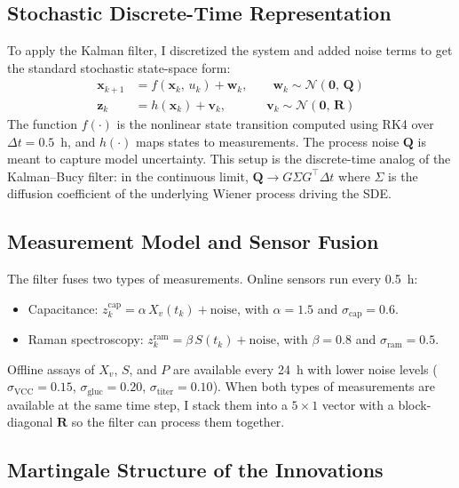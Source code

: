 \documentclass[11pt,letterpaper]{article}
\newcommand{\xv}{X_{v}}
\newcommand{\bx}{\mathbf{x}}
\newcommand{\bz}{\mathbf{z}}
\newcommand{\bw}{\mathbf{w}}
\newcommand{\bv}{\mathbf{v}}
\newcommand{\bQ}{\mathbf{Q}}
\newcommand{\bR}{\mathbf{R}}
\begin{document}
\subsection{Stochastic Discrete-Time Representation}

To apply the Kalman filter, I discretized the system and added noise terms to get the
standard stochastic state-space form:
\begin{align}
    \bx_{k+1} &= f(\bx_k,\, u_k) + \bw_k, \qquad \bw_k \sim \mathcal{N}(\mathbf{0},\, \bQ)
    \label{eq:process}\\
    \bz_k     &= h(\bx_k) + \bv_k, \qquad\quad\ \bv_k \sim \mathcal{N}(\mathbf{0},\, \bR)
    \label{eq:obs}
\end{align}
The function $f(\cdot)$ is the nonlinear state transition computed using RK4 over $\Delta t = 0.5$~h,
and $h(\cdot)$ maps states to measurements. The process noise $\bQ$ is meant to capture
model uncertainty. This setup is the discrete-time analog of the Kalman--Bucy filter: in the
continuous limit, $\bQ \to G\Sigma G^\top \Delta t$ where $\Sigma$ is the diffusion coefficient
of the underlying Wiener process driving the SDE.

\subsection{Measurement Model and Sensor Fusion}

The filter fuses two types of measurements. Online sensors run every 0.5~h:
\begin{itemize}
    \item Capacitance: $z^{\text{cap}}_k = \alpha\,\xv(t_k) + \text{noise}$, with $\alpha = 1.5$
          and $\sigma_{\text{cap}} = 0.6$.
    \item Raman spectroscopy: $z^{\text{ram}}_k = \beta\,S(t_k) + \text{noise}$, with $\beta = 0.8$
          and $\sigma_{\text{ram}} = 0.5$.
\end{itemize}
Offline assays of $\xv$, $S$, and $P$ are available every 24~h with lower noise levels
($\sigma_{\text{VCC}} = 0.15$, $\sigma_{\text{gluc}} = 0.20$, $\sigma_{\text{titer}} = 0.10$).
When both types of measurements are available at the same time step, I stack them into a
$5\times 1$ vector with a block-diagonal $\bR$ so the filter can process them together.

\subsection{Martingale Structure of the Innovations}
\end{document}
